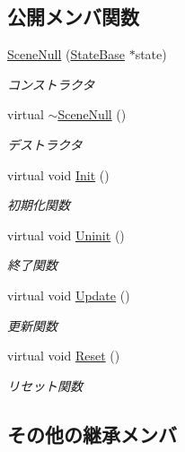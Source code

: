 \subsection*{公開メンバ関数}
\begin{DoxyCompactItemize}
\item 
\mbox{\hyperlink{class_scene_null_accf19999b93db3298bb702b3873fc4d5}{Scene\+Null}} (\mbox{\hyperlink{class_scene_base_1_1_state_base}{State\+Base}} $\ast$state)
\begin{DoxyCompactList}\small\item\em コンストラクタ \end{DoxyCompactList}\item 
virtual \mbox{\hyperlink{class_scene_null_a89dec83bf96f843211e53907d0bb5df5}{$\sim$\+Scene\+Null}} ()
\begin{DoxyCompactList}\small\item\em デストラクタ \end{DoxyCompactList}\item 
virtual void \mbox{\hyperlink{class_scene_null_a6b27830a755687f2c00149bcfa739388}{Init}} ()
\begin{DoxyCompactList}\small\item\em 初期化関数 \end{DoxyCompactList}\item 
virtual void \mbox{\hyperlink{class_scene_null_abbff54a7323b5ccde4b5094757747738}{Uninit}} ()
\begin{DoxyCompactList}\small\item\em 終了関数 \end{DoxyCompactList}\item 
virtual void \mbox{\hyperlink{class_scene_null_a79de810b699f496fda20e4ac837d075a}{Update}} ()
\begin{DoxyCompactList}\small\item\em 更新関数 \end{DoxyCompactList}\item 
virtual void \mbox{\hyperlink{class_scene_null_ae71209e6283270d35a3fad40103e9572}{Reset}} ()
\begin{DoxyCompactList}\small\item\em リセット関数 \end{DoxyCompactList}\end{DoxyCompactItemize}
\subsection*{その他の継承メンバ}


